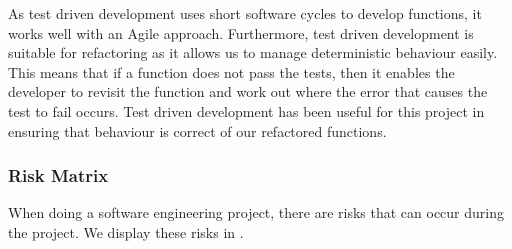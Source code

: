 As test driven development uses short software cycles to develop functions, it works well with an Agile approach.
Furthermore, test driven development is suitable for refactoring as it allows us to manage deterministic behaviour easily.
This means that if a function does not pass the tests, then it enables the developer to revisit the function and work out where the error that causes the test to fail occurs.
Test driven development has been useful for this project in ensuring that behaviour is correct of our refactored functions.
\subsubsection{Risk Matrix}
% 
When doing a software engineering project, there are risks that can occur during the project. We display these risks in .

\begin{table}[ht]
    \centering
    \caption{Risk matrix for project.}
    \label{tab:risks}
    
\end{table}

